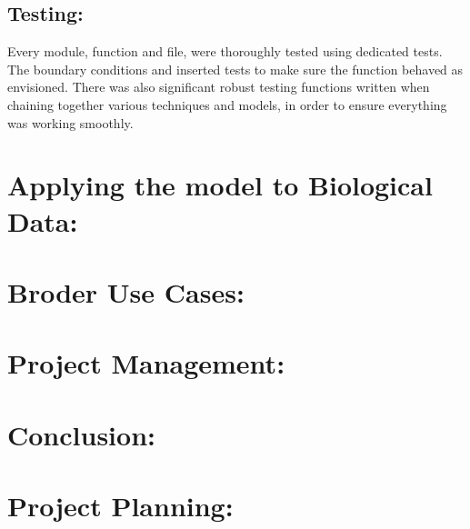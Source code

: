 \documentclass{article}
\begin{document}
\subsection{Testing: }
Every module, function and file, were thoroughly tested using dedicated tests. The boundary conditions and inserted tests to make sure the function behaved as envisioned. There was also significant robust testing functions written when chaining together various techniques and models, in order to ensure everything was working smoothly.\\ 













\section{ Applying the model to Biological Data: }


\section{Broder Use Cases: }

\section{Project Management: }


\section{Conclusion:}


 



\section{Project Planning: }

  
\end{document}
